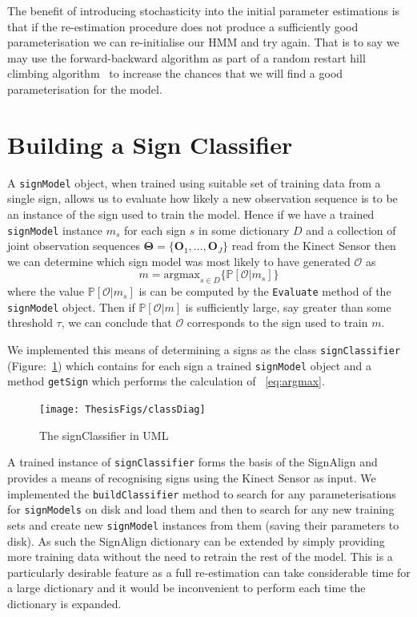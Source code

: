 The benefit of introducing stochasticity into the initial parameter estimations is that if the re-estimation procedure does not produce a sufficiently good parameterisation we can re-initialise our HMM and try again. That is to say we may use the forward-backward algorithm as part of a random restart hill climbing algorithm~\citep{russell1995artificial} to increase the chances that we will find a good parameterisation for the model.

\section{Building a Sign Classifier}
A \verb|signModel| object, when trained using suitable set of training data from a single sign, allows us to evaluate how likely a new observation sequence is to be an instance of the sign used to train the model. Hence if we have a trained \verb|signModel| instance $m_s$ for each sign $s$ in some dictionary $D$ and a collection of joint observation sequences $\bm{\Theta} = \{\mathbf{O}_1, \dots, \mathbf{O}_J\}$ read from the Kinect Sensor then we can determine which sign model was most likely to have generated $\mathcal{O}$ as
\begin{equation*}
m = \text{argmax}_{s \in D}\{ \mathbb{P}[\mathcal{O}|m_s]  \}  \label{eq:argmax} \tag{*}
\end{equation*}
where the value $\mathbb{P}[\mathcal{O}|m_s]$ is can be computed by the \verb|Evaluate| method of the \verb|signModel| object. Then if $\mathbb{P}[\mathcal{O}|m]$ is sufficiently large, say greater than some threshold $\tau$, we can conclude that $\mathcal{O}$ corresponds to the sign used to train $m$. 

We implemented this means of determining a signs as the class \verb|signClassifier| (Figure:~\ref{fig:scuml}) which contains for each sign a trained \verb|signModel| object and a method \verb|getSign| which performs the calculation of ~\eqref{eq:argmax}.
\begin{figure}[t]
        \centering
        \texttt{[image: ThesisFigs/classDiag]}
        \caption{The signClassifier in UML}\label{fig:scuml}
\end{figure}

A trained instance of \verb|signClassifier| forms the basis of the SignAlign and provides a means of recognising signs using the Kinect Sensor as input. We implemented the \verb|buildClassifier| method to search for any parameterisations for \verb|signModels| on disk and load them and then to search for any new training sets and create new \verb|signModel| instances from them (saving their parameters to disk). As such the SignAlign dictionary can be extended by simply providing more training data without the need to retrain the rest of the model. This is a particularly desirable feature as a full re-estimation can take considerable time for a large dictionary and it would be inconvenient to perform each time the dictionary is expanded.


